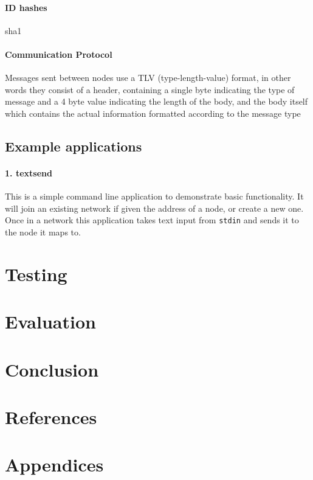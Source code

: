 \documentclass{article}
\begin{document}
\paragraph{ID hashes}
sha1 

\paragraph{Communication Protocol}
Messages sent between nodes use a TLV (type-length-value) format, in other words they consist of a header, containing a single byte indicating the type of message and a 4 byte value indicating the length of the body, and the body itself which contains the actual information formatted according to the message type

\subsection{Example applications}

\paragraph{1. textsend}

This is a simple command line application to demonstrate basic functionality. It will join an existing network if given the address of a node, or create a new one. Once in a network this application takes text input from \texttt{stdin} and sends it to the node it maps to.

\section{Testing}

\section{Evaluation}

\section{Conclusion}

\section{References}

%
%

\printbibliography


\section{Appendices}
\appendix
\end{document}
